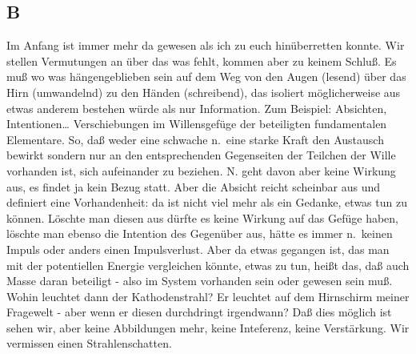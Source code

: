 \documentclass[
]{article}
\author{}
\date{\vspace{-2.5em}}
\begin{document}
\subsection{B}\label{b}

Im Anfang ist immer mehr da gewesen als ich zu euch hinüberretten
konnte. Wir stellen Vermutungen an über das was fehlt, kommen aber zu
keinem Schluß. Es muß wo was hängengeblieben sein auf dem Weg von den
Augen (lesend) über das Hirn (umwandelnd) zu den Händen (schreibend),
das isoliert möglicherweise aus etwas anderem bestehen würde als nur
Information. Zum Beispiel: Absichten, Intentionen\ldots{} Verschiebungen
im Willensgefüge der beteiligten fundamentalen Elementare. So, daß weder
eine schwache n.~eine starke Kraft den Austausch bewirkt sondern nur an
den entsprechenden Gegenseiten der Teilchen der Wille vorhanden ist,
sich aufeinander zu beziehen. N. geht davon aber keine Wirkung aus, es
findet ja kein Bezug statt. Aber die Absicht reicht scheinbar aus und
definiert eine Vorhandenheit: da ist nicht viel mehr als ein Gedanke,
etwas tun zu können. Löschte man diesen aus dürfte es keine Wirkung auf
das Gefüge haben, löschte man ebenso die Intention des Gegenüber aus,
hätte es immer n.~keinen Impuls oder anders einen Impulsverlust. Aber da
etwas gegangen ist, das man mit der potentiellen Energie vergleichen
könnte, etwas zu tun, heißt das, daß auch Masse daran beteiligt - also
im System vorhanden sein oder gewesen sein muß. Wohin leuchtet dann der
Kathodenstrahl? Er leuchtet auf dem Hirnschirm meiner Fragewelt - aber
wenn er diesen durchdringt irgendwann? Daß dies möglich ist sehen wir,
aber keine Abbildungen mehr, keine Inteferenz, keine Verstärkung. Wir
vermissen einen Strahlenschatten.
\end{document}
